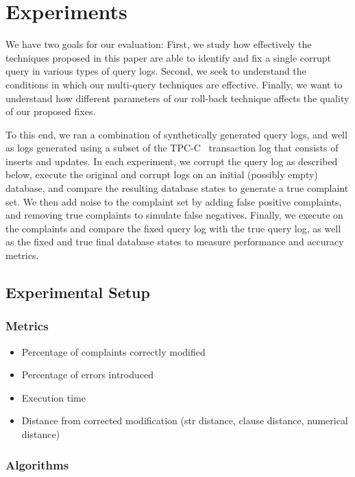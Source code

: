 \section{Experiments}

We have two goals for our evaluation: First, we study how effectively
the techniques proposed in this paper are able to identify and fix
a single corrupt query in various types of query logs.  Second, we
seek to understand the conditions in which our multi-query techniques
are effective.  Finally, we want to understand how different
parameters of our roll-back technique affects the quality of our
proposed fixes.

To this end,
we ran a combination of synthetically generated query logs, and
well as logs generated using a subset of the TPC-C~\cite{tpcc}
transaction log that consists of inserts and updates.  In each
experiment, we corrupt the query log as described below, execute
the original and corrupt logs on an initial (possibly empty) database,
and compare the resulting database states to generate a true complaint
set.  We then add noise to the complaint set by adding false positive
complaints, and removing true complaints to simulate false negatives.
Finally, we execute \sys on the complaints and compare the fixed
query log with the true query log, as well as the fixed and true
final database states to measure performance and accuracy metrics.


%
%

\subsection{Experimental Setup}

\subsubsection{Metrics}

\begin{itemize}
\item Percentage of complaints correctly modified
\item Percentage of errors introduced
\item Execution time
\item Distance from corrected modification (str distance, clause distance, numerical distance)
\end{itemize}

\subsubsection{Algorithms}

